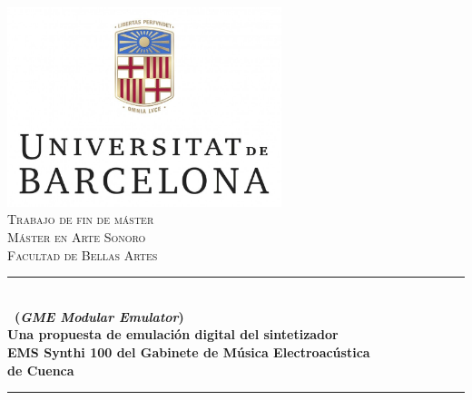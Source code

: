 \begin{titlepage}

\newcommand{\HRule}{\rule{\linewidth}{0.5mm}} %

\center %


\includegraphics[width=0.6\textwidth]{./portada/logoUB}\\[1cm] %
 

\textsc{\LARGE Trabajo de fin de máster}\\[1cm] %
\textsc{\Large Máster en Arte Sonoro}\\[0.5cm] %
\textsc{\large Facultad de Bellas Artes}\\[0.5cm] %


\HRule \\[0.4cm]
{ \Large \bfseries  \appName\ (\textit{GME Modular Emulator})\\ \vspace{0.4cm} \normalsize Una propuesta de emulación digital del sintetizador\\ EMS Synthi 100 del Gabinete de Música Electroacústica\\de Cuenca}\\[0.4cm] %
\HRule \\[0.5cm]
 

\end{titlepage}
